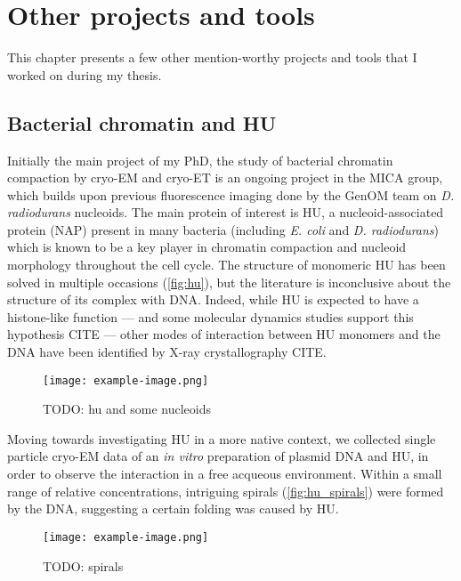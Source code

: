 \chapter{Other projects and tools}\label{other_projects}

This chapter presents a few other mention-worthy projects and tools that I worked on during my thesis.

\localtableofcontents

\section{Bacterial chromatin and HU}

Initially the main project of my PhD, the study of bacterial chromatin compaction by cryo-EM and cryo-ET is an ongoing project in the MICA group, which builds upon previous fluorescence imaging done by the GenOM team on \textit{D. radiodurans} nucleoids.
The main protein of interest is HU, a nucleoid-associated protein (NAP) present in many bacteria (including \textit{E. coli} and \textit{D. radiodurans}) which is known to be a key player in chromatin compaction and nucleoid morphology throughout the cell cycle.
The structure of monomeric HU has been solved in multiple occasions (\autoref{fig:hu}), but the literature is inconclusive about the structure of its complex with DNA.
Indeed, while HU is expected to have a histone-like function --- and some molecular dynamics studies support this hypothesis CITE --- other modes of interaction between HU monomers and the DNA have been identified by X-ray crystallography CITE.

\begin{figure}[ht]
    \centering
    \texttt{[image: example-image.png]}
    \caption{TODO: hu and some nucleoids}
    \label{fig:hu}
\end{figure}

Moving towards investigating HU in a more native context, we collected single particle cryo-EM data of an \textit{in vitro} preparation of plasmid DNA and HU, in order to observe the interaction in a free acqueous environment.
Within a small range of relative concentrations, intriguing spirals (\autoref{fig:hu_spirals}) were formed by the DNA, suggesting a certain folding was caused by HU.

\begin{figure}[ht]
    \centering
    \texttt{[image: example-image.png]}
    \caption{TODO: spirals}
    \label{fig:hu_spirals}
\end{figure}

